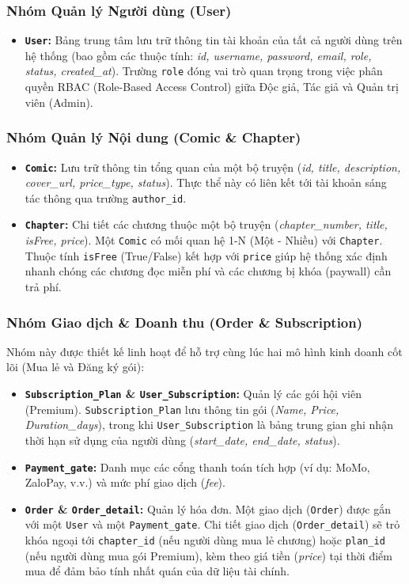 \subsubsection{Nhóm Quản lý Người dùng (User)}
\begin{itemize}
    \item \textbf{\texttt{User}:} Bảng trung tâm lưu trữ thông tin tài khoản của tất cả người dùng trên hệ thống (bao gồm các thuộc tính: \textit{id, username, password, email, role, status, created\_at}). Trường \texttt{role} đóng vai trò quan trọng trong việc phân quyền RBAC (Role-Based Access Control) giữa Độc giả, Tác giả và Quản trị viên (Admin).
\end{itemize}

\subsubsection{Nhóm Quản lý Nội dung (Comic \& Chapter)}
\begin{itemize}
    \item \textbf{\texttt{Comic}:} Lưu trữ thông tin tổng quan của một bộ truyện (\textit{id, title, description, cover\_url, price\_type, status}). Thực thể này có liên kết tới tài khoản sáng tác thông qua trường \texttt{author\_id}.
    \item \textbf{\texttt{Chapter}:} Chi tiết các chương thuộc một bộ truyện (\textit{chapter\_number, title, isFree, price}). Một \texttt{Comic} có mối quan hệ 1-N (Một - Nhiều) với \texttt{Chapter}. Thuộc tính \texttt{isFree} (True/False) kết hợp với \texttt{price} giúp hệ thống xác định nhanh chóng các chương đọc miễn phí và các chương bị khóa (paywall) cần trả phí.
\end{itemize}

\subsubsection{Nhóm Giao dịch \& Doanh thu (Order \& Subscription)}
Nhóm này được thiết kế linh hoạt để hỗ trợ cùng lúc hai mô hình kinh doanh cốt lõi (Mua lẻ và Đăng ký gói):
\begin{itemize}
    \item \textbf{\texttt{Subscription\_Plan} \& \textbf{\texttt{User\_Subscription}}:} Quản lý các gói hội viên (Premium). \texttt{Subscription\_Plan} lưu thông tin gói (\textit{Name, Price, Duration\_days}), trong khi \texttt{User\_Subscription} là bảng trung gian ghi nhận thời hạn sử dụng của người dùng (\textit{start\_date, end\_date, status}).
    \item \textbf{\texttt{Payment\_gate}:} Danh mục các cổng thanh toán tích hợp (ví dụ: MoMo, ZaloPay, v.v.) và mức phí giao dịch (\textit{fee}).
    \item \textbf{\texttt{Order} \& \textbf{\texttt{Order\_detail}}:} Quản lý hóa đơn. Một giao dịch (\texttt{Order}) được gắn với một \texttt{User} và một \texttt{Payment\_gate}. Chi tiết giao dịch (\texttt{Order\_detail}) sẽ trỏ khóa ngoại tới \texttt{chapter\_id} (nếu người dùng mua lẻ chương) hoặc \texttt{plan\_id} (nếu người dùng mua gói Premium), kèm theo giá tiền (\textit{price}) tại thời điểm mua để đảm bảo tính nhất quán của dữ liệu tài chính.
\end{itemize}

